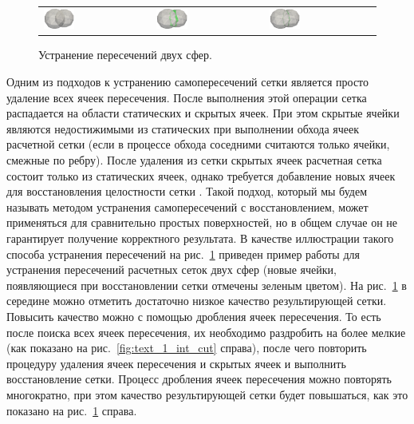 \begin{figure}[ht]
\centering
\begin{tabular}{lll}
\includegraphics[width=0.3\textwidth]{fig/int_pic_zip_01.png}
&
\includegraphics[width=0.3\textwidth]{fig/int_pic_zip_09.png}
&
\includegraphics[width=0.3\textwidth]{fig/int_pic_zip_15.png}
\end{tabular}
\singlespacing
{}\caption{Устранение пересечений двух сфер.}
\label{fig:text_1_int_spheres}
\end{figure}

Одним из подходов к устранению самопересечений сетки является просто удаление всех ячеек пересечения.
После выполнения этой операции сетка распадается на области статических и скрытых ячеек.
При этом скрытые ячейки являются недостижимыми из статических при выполнении обхода ячеек расчетной сетки (если в процессе обхода соседними считаются только ячейки, смежные по ребру).
После удаления из сетки скрытых ячеек расчетная сетка состоит только из статических ячеек, однако требуется добавление новых ячеек для восстановления целостности сетки \cite{Charton2021Repair}.
Такой подход, который мы будем называть методом устранения самопересечений с восстановлением, может применяться для сравнительно простых поверхностей, но в общем случае он не гарантирует получение корректного результата.
В качестве иллюстрации такого способа устранения пересечений на рис.~\ref{fig:text_1_int_spheres} приведен пример работы для устранения пересечений расчетных сеток двух сфер (новые ячейки, появляющиеся при восстановлении сетки отмечены зеленым цветом).
На рис.~\ref{fig:text_1_int_spheres} в середине можно отметить достаточно низкое качество результирующей сетки.
Повысить качество можно с помощью дробления ячеек пересечения.
То есть после поиска всех ячеек пересечения, их необходимо раздробить на более мелкие (как показано на рис.~\ref{fig:text_1_int_cut} справа), после чего повторить процедуру удаления ячеек пересечения и скрытых ячеек и выполнить восстановление сетки.
Процесс дробления ячеек пересечения можно повторять многократно, при этом качество результирующей сетки будет повышаться, как это показано на рис.~\ref{fig:text_1_int_spheres} справа.

